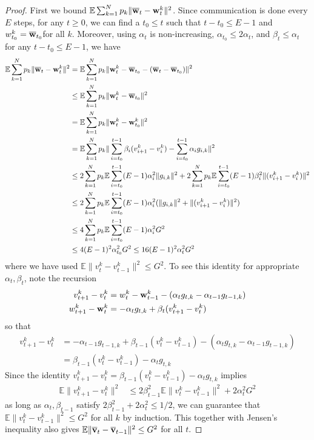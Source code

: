 \begin{proof}
First we bound $\mathbb{E}\sum_{k=1}^{N}p_{k}\|{\overline{\mathbf{w}}}_{t}-{\mathbf{w}}_{t}^{k}\|^{2}$.
Since communication is done every $E$ steps, for any $t\geq0$, we
can find a $t_{0}\leq t$ such that $t-t_{0}\leq E-1$ and $w_{t_{0}}^{k}={\overline{\mathbf{w}}}_{t_{0}}$for
all $k$. Moreover, using $\alpha_{t}$ is non-increasing, $\alpha_{t_{0}}\leq2\alpha{}_{t}$,
and $\beta_{t}\leq\alpha_{t}$ for any $t-t_{0}\leq E-1$, we have
\begin{align*}
\mathbb{E}\sum_{k=1}^{N}p_{k}\|{\overline{\mathbf{w}}}_{t}-{\mathbf{w}}_{t}^{k}\|^{2} & =\mathbb{E}\sum_{k=1}^{N}p_{k}\|{\mathbf{w}}_{t}^{k}-{\overline{\mathbf{w}}}_{t_{0}}-({\overline{\mathbf{w}}}_{t}-{\overline{\mathbf{w}}}_{t_{0}})\|^{2}\\
& \leq\mathbb{E}\sum_{k=1}^{N}p_{k}\|{\mathbf{w}}_{t}^{k}-{\overline{\mathbf{w}}}_{t_{0}}\|^{2}\\
& =\mathbb{E}\sum_{k=1}^{N}p_{k}\|{\mathbf{w}}_{t}^{k}-{\mathbf{w}}_{t_{0}}^{k}\|^{2}\\
& =\mathbb{E}\sum_{k=1}^{N}p_{k}\|\sum_{i=t_{0}}^{t-1}\beta_{i}(v_{i+1}^{k}-v_{i}^{k})-\sum_{i=t_{0}}^{t-1}\alpha_{i}g_{i,k}\|^{2}\\
& \leq2\sum_{k=1}^{N}p_{k}\mathbb{E}\sum_{i=t_{0}}^{t-1}(E-1)\alpha_{i}^{2}\|g_{i,k}\|^{2}+2\sum_{k=1}^{N}p_{k}\mathbb{E}\sum_{i=t_{0}}^{t-1}(E-1)\beta_{i}^{2}\|(v_{i+1}^{k}-v_{i}^{k})\|^{2}\\
& \leq2\sum_{k=1}^{N}p_{k}\mathbb{E}\sum_{i=t_{0}}^{t-1}(E-1)\alpha_{i}^{2}(\|g_{i,k}\|^{2}+\|(v_{i+1}^{k}-v_{i}^{k})\|^{2})\\
& \leq4\sum_{k=1}^{N}p_{k}\mathbb{E}\sum_{i=t_{0}}^{t-1}(E-1)\alpha_{i}^{2}G^{2}\\
& \leq4(E-1)^{2}\alpha_{t_{0}}^{2}G^{2}\leq16(E-1)^{2}\alpha_{t}^{2}G^{2}
\end{align*}
where we have used $\mathbb{E}\|v_{t}^{k}-v_{t-1}^{k}\|^{2}\leq G^{2}$.
To see this identity for appropriate $\alpha_{t},\beta_{t}$, note
the recursion 
\begin{align*}
v_{t+1}^{k}-v_{t}^{k} & =w_{t}^{k}-{\mathbf{w}}_{t-1}^{k}-(\alpha_{t}g_{t,k}-\alpha_{t-1}g_{t-1,k})\\
w_{t+1}^{k}-{\mathbf{w}}_{t}^{k} & =-\alpha_{t}g_{t,k}+\beta_{t}(v_{t+1}^{k}-v_{t}^{k})
\end{align*}
so that 
\begin{align*}
v_{t+1}^{k}-v_{t}^{k} & =-\alpha_{t-1}g_{t-1,k}+\beta_{t-1}(v_{t}^{k}-v_{t-1}^{k})-(\alpha_{t}g_{t,k}-\alpha_{t-1}g_{t-1,k})\\
& =\beta_{t-1}(v_{t}^{k}-v_{t-1}^{k})-\alpha_{t}g_{t,k}
\end{align*}
Since the identity $v_{t+1}^{k}-v_{t}^{k}=\beta_{t-1}(v_{t}^{k}-v_{t-1}^{k})-\alpha_{t}g_{t,k}$
implies 
\begin{align*}
\mathbb{E}\|v_{t+1}^{k}-v_{t}^{k}\|^{2} & \leq2\beta_{t-1}^{2}\mathbb{E}\|v_{t}^{k}-v_{t-1}^{k}\|^{2}+2\alpha_{t}^{2}G^{2}
\end{align*}
as long as $\alpha_{t},\beta_{t-1}$ satisfy $2\beta_{t-1}^{2}+2\alpha_{t}^{2}\leq1/2$,
we can guarantee that $\mathbb{E}\|v_{t}^{k}-v_{t-1}^{k}\|^{2}\leq G^{2}$
for all $k$ by induction. This together with Jensen's inequality
also gives $\mathbb{E}\|{\overline{\mathbf{v}}}_{t}-{\overline{\mathbf{v}}}_{t-1}\|^{2}\leq G^{2}$
for all $t$. 


\end{proof}
